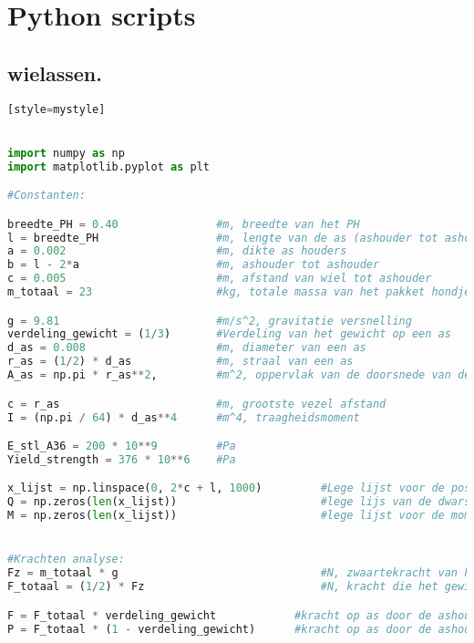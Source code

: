 \chapter{Python scripts}
\label{Cha:Bijlage_F}

\section{wielassen.}
\label{se:f.wielassen}

\begin{lstlisting}[language=Python][style=mystyle]


import numpy as np
import matplotlib.pyplot as plt

#Constanten:

breedte_PH = 0.40               #m, breedte van het PH
l = breedte_PH                  #m, lengte van de as (ashouder tot ashouder)
a = 0.002                       #m, dikte as houders
b = l - 2*a                     #m, ashouder tot ashouder
c = 0.005                       #m, afstand van wiel tot ashouder
m_totaal = 23                   #kg, totale massa van het pakket hondje

g = 9.81                        #m/s^2, gravitatie versnelling
verdeling_gewicht = (1/3)       #Verdeling van het gewicht op een as
d_as = 0.008                    #m, diameter van een as
r_as = (1/2) * d_as             #m, straal van een as
A_as = np.pi * r_as**2,         #m^2, oppervlak van de doorsnede van de as

c = r_as                        #m, grootste vezel afstand
I = (np.pi / 64) * d_as**4      #m^4, traagheidsmoment

E_stl_A36 = 200 * 10**9         #Pa
Yield_strength = 376 * 10**6    #Pa     

x_lijst = np.linspace(0, 2*c + l, 1000)         #Lege lijst voor de positie
Q = np.zeros(len(x_lijst))                      #lege lijs van de dwarskrachten
M = np.zeros(len(x_lijst))                      #lege lijst voor de momenten in de as


#Krachten analyse:
Fz = m_totaal * g                               #N, zwaartekracht van het pakkethondje
F_totaal = (1/2) * Fz                           #N, kracht die het gewicht uitoefent op een as

F = F_totaal * verdeling_gewicht            #kracht op as door de ashouder bij de eerste ashouder, Newton
P = F_totaal * (1 - verdeling_gewicht)      #kracht op as door de ashouder bij de tweede ashouder, Newton


\end{lstlisting}

